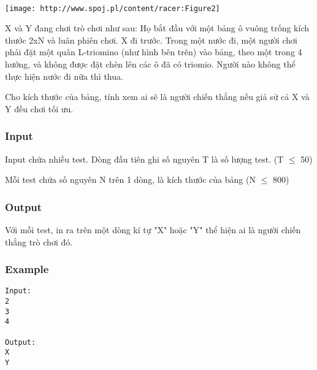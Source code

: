 

 


\texttt{[image: http://www.spoj.pl/content/racer:Figure2]}

X và Y đang chơi trò chơi như sau: Họ bắt đầu với một bảng ô vuông trống kích thước 2xN và luân phiên chơi. X đi trước. Trong một nước đi, một người chơi phải đặt một quân L-triomino (như hình bên trên) vào bảng, theo một trong 4 hướng, và không được đặt chèn lên các ô đã có triomio. Người nào không thể thực hiện nước đi nữa thì thua.

Cho kích thước của bảng, tính xem ai sẽ là người chiến thắng nếu giả sử cả X và Y đều chơi tối ưu.

\subsubsection{Input}

Input chứa nhiều test. Dòng đầu tiên ghi số nguyên T là số lượng test. (T $\le$ 50)

Mỗi test chứa số nguyên N trên 1 dòng, là kích thước của bảng (N $\le$ 800)

\subsubsection{Output}

Với mỗi test, in ra trên một dòng kí tự "X" hoặc "Y" thể hiện ai là người chiến thắng trò chơi đó.

\subsubsection{Example}
\begin{verbatim}
Input:
2
3
4

Output:
X
Y
\end{verbatim}
